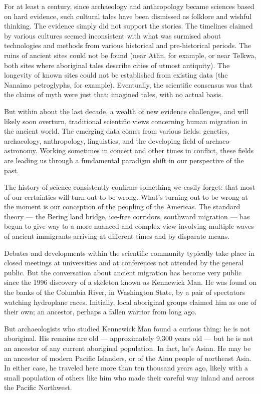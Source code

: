 \documentclass[letterpaper,oneside]{memoir}
\begin{document}
\begin{description}
For at least a century, since archaeology and anthropology became
sciences based on hard evidence, such cultural tales have been
dismissed as folklore and wishful thinking. The evidence simply did
not support the stories. The timelines claimed by various cultures
seemed inconsistent with what was surmised about technologies and
methods from various historical and pre-historical periods. The ruins
of ancient sites could not be found (near Atlin, for example, or near
Telkwa, both sites where aboriginal tales describe cities of utmost
antiquity). The longevity of known sites could not be established from
existing data (the Nanaimo petroglyphs, for example). Eventually, the
scientific consensus was that the claims of myth were just that:
imagined tales, with no actual basis.

But within about the last decade, a wealth of new evidence challenges,
and will likely soon overturn, traditional scientific views concerning
human migration in the ancient world. The emerging data comes from
various fields: genetics, archaeology, anthropology, linguistics, and
the developing field of archaeo-astronomy. Working sometimes in
concert and other times in conflict, these fields are leading us
through a fundamental paradigm shift in our perspective of the past.

The history of science consistently confirms something we easily
forget: that most of our certainties will turn out to be wrong. What's
turning out to be wrong at the moment is our conception of the
peopling of the Americas. The standard theory --- the Bering land
bridge, ice-free corridors, southward migration --- has begun to give
way to a more nuanced and complex view involving multiple waves of
ancient immigrants arriving at different times and by disparate means.

Debates and developments within the scientific community typically
take place in closed meetings at universities and at conferences not
attended by the general public. But the conversation about ancient
migration has become very public since the 1996 discovery of a
skeleton known as Kennewick Man. He was found on the banks of the
Columbia River, in Washington State, by a pair of spectators watching
hydroplane races. Initially, local aboriginal groups claimed him as
one of their own; an ancestor, perhaps a fallen warrior from long ago.

But archaeologists who studied Kennewick Man found a curious thing: he
is not aboriginal. His remains are old --- approximately 9,300 years
old --- but he is not an ancestor of any current aboriginal population.
In fact, he's Asian. He may be an ancestor of modern Pacific
Islanders, or of the Ainu people of northeast Asia. In either case, he
traveled here more than ten thousand years ago, likely with a small
population of others like him who made their careful way inland and
across the Pacific Northwest.


\end{description}
\end{document}
